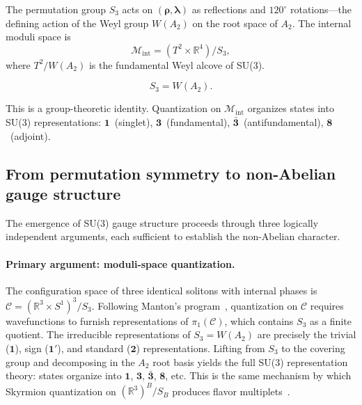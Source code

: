 \documentclass[a4paper,12pt]{article}
\begin{document}
The permutation group $S_3$ acts on $(\boldsymbol{\rho},
\boldsymbol{\lambda})$ as reflections and $120^\circ$ rotations---the
defining action of the Weyl group $W(A_2)$ on the root space of
$A_2$. The internal moduli space is
\begin{equation}
 \mathcal{M}_{\mathrm{int}} = (T^2 \times \mathbb{R}^4)/S_3,
\end{equation}
where $T^2/W(A_2)$ is the fundamental Weyl alcove of SU(3).

\begin{equation}
 \boxed{S_3 = W(A_2).}
\end{equation}

This is a group-theoretic identity. Quantization on
$\mathcal{M}_{\mathrm{int}}$ organizes states into SU(3)
representations:
$\mathbf{1}$~(singlet),
$\mathbf{3}$~(fundamental),
$\bar{\mathbf{3}}$~(antifundamental),
$\mathbf{8}$~(adjoint).

\subsection{From permutation symmetry to non-Abelian gauge structure}
\label{sec:nonabelian}

The emergence of SU(3) gauge structure proceeds through three
logically independent arguments, each sufficient to establish the
non-Abelian character.

\paragraph{Primary argument: moduli-space quantization.}
The configuration space of three identical solitons with internal
phases is $\mathcal{C} = (\mathbb{R}^3 \times S^1)^3/S_3$.
Following Manton's program~\cite{Manton1987}, quantization on
$\mathcal{C}$ requires wavefunctions to furnish representations of
$\pi_1(\mathcal{C})$, which contains $S_3$ as a finite quotient.
The irreducible representations of $S_3 = W(A_2)$ are precisely
the trivial ($\mathbf{1}$), sign ($\mathbf{1}'$), and standard
($\mathbf{2}$) representations. Lifting from $S_3$ to the
covering group and decomposing in the $A_2$ root basis yields
the full SU(3) representation theory: states organize into
$\mathbf{1}$, $\mathbf{3}$, $\bar{\mathbf{3}}$, $\mathbf{8}$,
etc. This is the same mechanism by which Skyrmion quantization
on $(\mathbb{R}^3)^B/S_B$ produces flavor multiplets~\cite{Manton1987}.
\end{document}
